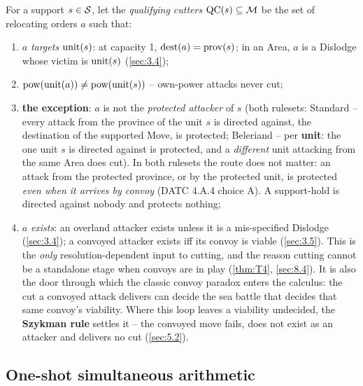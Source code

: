 \documentclass[12pt,a4paper]{article}
\begin{document}
For a support $s \in \mathcal{S}$, let the \emph{qualifying cutters} $\operatorname{QC}(s) \subseteq \mathcal{M}$ be the set of relocating orders $a$ such that:
\begin{enumerate}
\item $a$ \emph{targets} $\operatorname{unit}(s)$: at capacity 1, $\operatorname{dest}(a) = \operatorname{prov}(s)$; in an Area, $a$ is a Dislodge whose victim is $\operatorname{unit}(s)$ (\cref{sec:3.4});
\item $\operatorname{pow}(\operatorname{unit}(a)) \ne \operatorname{pow}(\operatorname{unit}(s))$ -- own-power attacks never cut;
\item \textbf{the exception}: $a$ is not the \emph{protected attacker} of $s$ (both rulesets: Standard -- every attack from the province of the unit $s$ is directed against, the destination of the supported Move, is protected; Beleriand -- per \textbf{unit}: the one unit $s$ is directed against is protected, and a \emph{different} unit attacking from the same Area does cut).
In both rulesets the route does not matter: an attack from the protected province, or by the protected unit, is protected \emph{even when it arrives by convoy} (DATC 4.A.4 choice A).
A support-hold is directed against nobody and protects nothing;
\item $a$ \emph{exists}: an overland attacker exists unless it is a mis-specified Dislodge (\cref{sec:3.4}); a convoyed attacker exists iff its convoy is viable (\cref{sec:3.5}).
This is the \emph{only} resolution-dependent input to cutting, and the reason cutting cannot be a standalone stage when convoys are in play (\cref{thm:T4}, \cref{sec:8.4}).
It is also the door through which the classic convoy paradox enters the calculus: the cut a convoyed attack delivers can decide the sea battle that decides that same convoy's viability.
Where this loop leaves a viability undecided, the \textbf{Szykman rule} settles it -- the convoyed move fails, does not exist as an attacker and delivers no cut (\cref{sec:5.2}).
\end{enumerate}

\subsection{One-shot simultaneous arithmetic}\label{sec:3.2}
\end{document}
